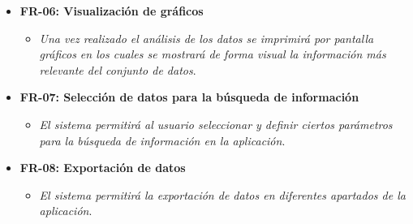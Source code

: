 \documentclass[../../main.tex]{subfiles}
\begin{document}
\begin{itemize}
    \item \textbf{FR-06: Visualización de gráficos }
    \begin{itemize}
        \item \textit{Una vez realizado el análisis de los datos se imprimirá por pantalla gráficos en los cuales se mostrará de forma visual la información más relevante del conjunto de datos}.
    \end{itemize}
    \item \textbf{FR-07: Selección de datos para la búsqueda de información }
    \begin{itemize}
        \item \textit{El sistema permitirá al usuario seleccionar y definir ciertos parámetros para la búsqueda de información en la aplicación}.
    \end{itemize}
    \item \textbf{FR-08: Exportación de datos}
    \begin{itemize}
        \item \textit{El sistema permitirá la exportación de datos en diferentes apartados de la aplicación}.
    \end{itemize}
\end{itemize}
\end{document}
